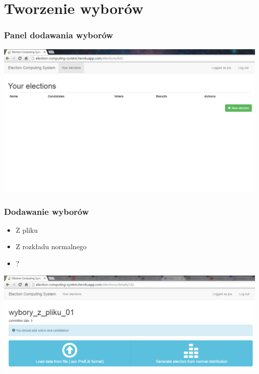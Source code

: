 \documentclass{beamer}
\begin{document}
\section{Tworzenie wyborów}
\begin{frame}
\frametitle{Panel dodawania wyborów}
\begin{center}
\includegraphics[width=0.8\paperwidth]{screenshots/04_new_elections.png}
\end{center}
\end{frame}
\begin{frame}
\frametitle{Dodawanie wyborów}
\begin{itemize}
	\item Z pliku
	\item Z rozkładu normalnego
	\item ?
\end{itemize}
\begin{center}
	\includegraphics[width=0.8\paperwidth]{screenshots/06_load_soc.png}
\end{center}
\end{frame}
\end{document}
